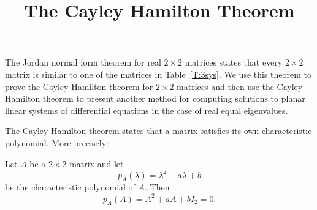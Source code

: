 \documentclass{ximera}
\title{The Cayley Hamilton Theorem}
\begin{document}
\begin{abstract}
\end{abstract}
\maketitle

\label{S:6.6}

The Jordan normal form theorem for real $2\times 2$ matrices states that 
every $2\times 2$ matrix is similar to one of the matrices in Table~\ref{T:3sys}.
We use this theorem to prove the Cayley Hamilton theorem 
 for $2\times 2$ 
matrices and then use the Cayley Hamilton theorem to present another method 
for computing solutions to planar linear systems of differential equations in the 
case of real equal eigenvalues.


The Cayley Hamilton theorem states that a matrix satisfies its own
characteristic polynomial.  More precisely:
\begin{theorem} \label{T:CH2}
Let $A$ be a $2\times 2$ matrix and let
\[
p_A(\lambda) = \lambda^2 + a\lambda + b
\]
be the characteristic polynomial of $A$.  Then
\[
p_A(A) = A^2 + aA + bI_2 = 0.
\]
\end{theorem}
\end{document}
